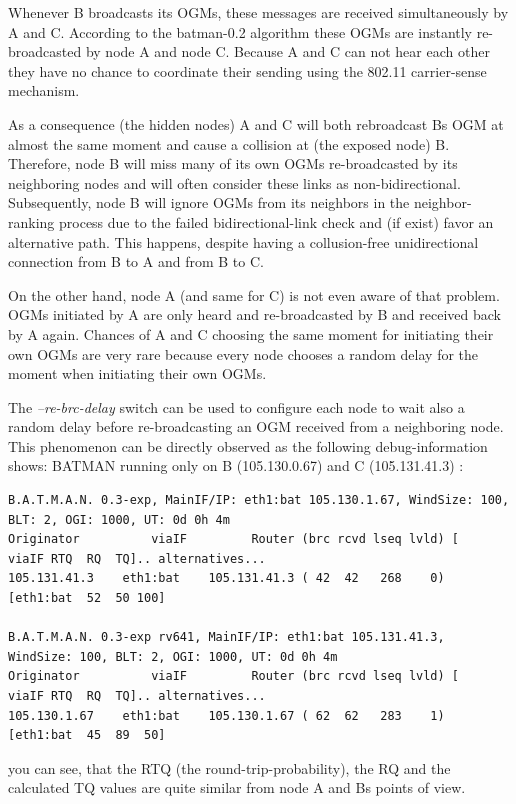 \documentclass[11pt]{article}
\begin{document}
Whenever B broadcasts its OGMs, these messages are received simultaneously by A and C. According to the batman-0.2 algorithm these OGMs are instantly re-broadcasted by node A and node C. Because A and C can not hear each other they have no chance to coordinate their sending using the 802.11 carrier-sense mechanism.

As a consequence (the hidden nodes) A and C will both rebroadcast Bs OGM at almost the same moment and cause a collision at (the exposed node) B. Therefore, node B will miss many of its own OGMs re-broadcasted by its neighboring nodes and will often consider these links as non-bidirectional. Subsequently, node B will ignore OGMs from its neighbors in the neighbor-ranking process due to the failed bidirectional-link check and (if exist) favor an alternative path. This happens, despite having a collusion-free unidirectional connection from B to A and from B to C.

On the other hand, node A (and same for C) is not even aware of that problem. OGMs initiated by A are only heard and re-broadcasted by B and received back by A again. Chances of A and C choosing the same moment for initiating their own OGMs are very rare because every node chooses a random delay for the moment when initiating their own OGMs.

The \emph{--re-brc-delay} switch can be used to configure each node to wait also a random delay before re-broadcasting an OGM received from a neighboring node.
%
This phenomenon can be directly observed as the following debug-information shows:
%
BATMAN running only on B (105.130.0.67) and C (105.131.41.3) :

\begin{small}
\begin{verbatim}
B.A.T.M.A.N. 0.3-exp, MainIF/IP: eth1:bat 105.130.1.67, WindSize: 100, BLT: 2, OGI: 1000, UT: 0d 0h 4m
Originator          viaIF         Router (brc rcvd lseq lvld) [   viaIF RTQ  RQ  TQ].. alternatives...
105.131.41.3    eth1:bat    105.131.41.3 ( 42  42   268    0) [eth1:bat  52  50 100]

B.A.T.M.A.N. 0.3-exp rv641, MainIF/IP: eth1:bat 105.131.41.3, WindSize: 100, BLT: 2, OGI: 1000, UT: 0d 0h 4m
Originator          viaIF         Router (brc rcvd lseq lvld) [   viaIF RTQ  RQ  TQ].. alternatives...
105.130.1.67    eth1:bat    105.130.1.67 ( 62  62   283    1) [eth1:bat  45  89  50]
\end{verbatim}
\end{small}

you can see, that the RTQ (the round-trip-probability), the RQ and the calculated TQ values 
are quite similar from node A and Bs points of view.
\end{document}
